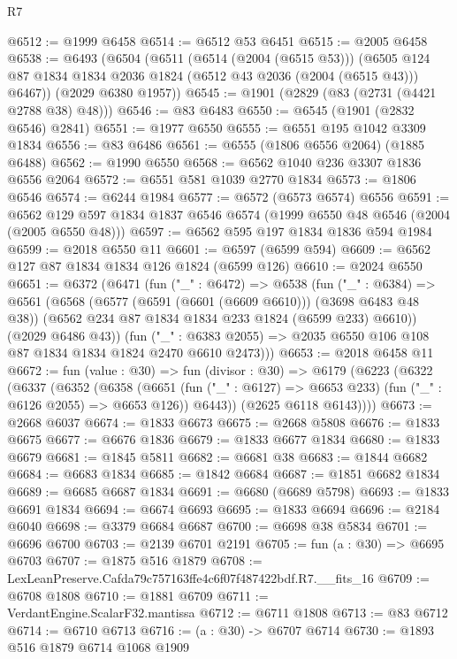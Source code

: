 \begin{lexlean}{R7}
\begin{coremodule}
@6512 := @1999 @6458
@6514 := @6512 @53 @6451
@6515 := @2005 @6458
@6538 := @6493
    (@6504
      (@6511
        (@6514 (@2004 (@6515 @53)))
        (@6505 @124 @87 @1834 @1834 @2036 @1824 (@6512 @43 @2036 (@2004 (@6515 @43))) @6467))
      (@2029 @6380 @1957))
@6545 := @1901 (@2829 (@83 (@2731 (@4421 @2788 @38) @48)))
@6546 := @83 @6483
@6550 := @6545 (@1901 (@2832 @6546) @2841)
@6551 := @1977 @6550
@6555 := @6551 @195 @1042 @3309 @1834
@6556 := @83 @6486
@6561 := @6555 (@1806 @6556 @2064) (@1885 @6488)
@6562 := @1990 @6550
@6568 := @6562 @1040 @236 @3307 @1836 @6556 @2064
@6572 := @6551 @581 @1039 @2770 @1834
@6573 := @1806 @6546
@6574 := @6244 @1984
@6577 := @6572 (@6573 @6574) @6556
@6591 := @6562 @129 @597 @1834 @1837 @6546 @6574 (@1999 @6550 @48 @6546 (@2004 (@2005 @6550 @48)))
@6597 := @6562 @595 @197 @1834 @1836 @594 @1984
@6599 := @2018 @6550 @11
@6601 := @6597 (@6599 @594)
@6609 := @6562 @127 @87 @1834 @1834 @126 @1824 (@6599 @126)
@6610 := @2024 @6550
@6651 := @6372
    (@6471
      (fun ("_" : @6472) =>
      @6538
        (fun ("_" : @6384) =>
        @6561
          (@6568
            (@6577 (@6591 (@6601 (@6609 @6610))) (@3698 @6483 @48 @38))
            (@6562 @234 @87 @1834 @1834 @233 @1824 (@6599 @233) @6610))
          (@2029 @6486 @43))
        (fun ("_" : @6383 @2055) => @2035 @6550 @106 @108 @87 @1834 @1834 @1824 @2470 @6610 @2473)))
@6653 := @2018 @6458 @11
@6672 := fun (value : @30) =>
  fun (divisor : @30) =>
  @6179
    (@6223
      (@6322
        (@6337
          (@6352
            (@6358
              (@6651 (fun ("_" : @6127) => @6653 @233) (fun ("_" : @6126 @2055) => @6653 @126))
              @6443))
          (@2625 @6118 @6143))))
@6673 := @2668 @6037
@6674 := @1833 @6673
@6675 := @2668 @5808
@6676 := @1833 @6675
@6677 := @6676 @1836
@6679 := @1833 @6677 @1834
@6680 := @1833 @6679
@6681 := @1845 @5811
@6682 := @6681 @38
@6683 := @1844 @6682
@6684 := @6683 @1834
@6685 := @1842 @6684
@6687 := @1851 @6682 @1834
@6689 := @6685 @6687 @1834
@6691 := @6680 (@6689 @5798)
@6693 := @1833 @6691 @1834
@6694 := @6674 @6693
@6695 := @1833 @6694
@6696 := @2184 @6040
@6698 := @3379 @6684 @6687
@6700 := @6698 @38 @5834
@6701 := @6696 @6700
@6703 := @2139 @6701 @2191
@6705 := fun (a : @30) => @6695 @6703
@6707 := @1875 @516 @1879
@6708 := LexLeanPreserve.Cafda79c757163ffe4c6f07f487422bdf.R7.__fits_16
@6709 := @6708 @1808
@6710 := @1881 @6709
@6711 := VerdantEngine.ScalarF32.mantissa
@6712 := @6711 @1808
@6713 := @83 @6712
@6714 := @6710 @6713
@6716 := (a : @30) -> @6707 @6714
@6730 := @1893
    @516
    @1879
    @6714
    @1068
    @1909

\end{coremodule}
\end{lexlean}
